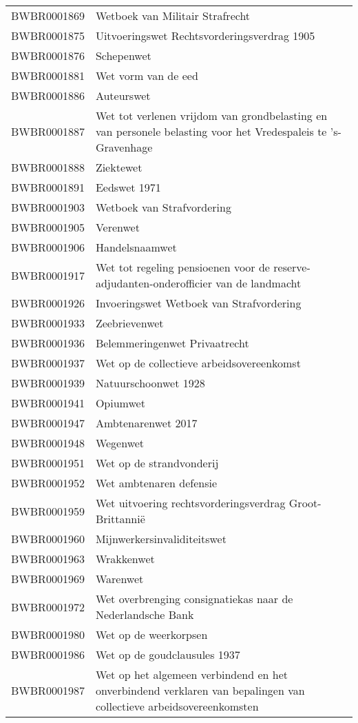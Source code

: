 \begin{longtable}{lp{}}
BWBR0001869 & Wetboek van Militair Strafrecht \\
BWBR0001875 & Uitvoeringswet Rechtsvorderingsverdrag 1905 \\
BWBR0001876 & Schepenwet \\
BWBR0001881 & Wet vorm van de eed \\
BWBR0001886 & Auteurswet \\
BWBR0001887 & Wet tot verlenen vrijdom van grondbelasting en van personele belasting voor het Vredespaleis te 's-Gravenhage \\
BWBR0001888 & Ziektewet \\
BWBR0001891 & Eedswet 1971 \\
BWBR0001903 & Wetboek van Strafvordering \\
BWBR0001905 & Verenwet \\
BWBR0001906 & Handelsnaamwet \\
BWBR0001917 & Wet tot regeling pensioenen voor de reserve-adjudanten-onderofficier van de landmacht \\
BWBR0001926 & Invoeringswet Wetboek van Strafvordering \\
BWBR0001933 & Zeebrievenwet \\
BWBR0001936 & Belemmeringenwet Privaatrecht \\
BWBR0001937 & Wet op de collectieve arbeidsovereenkomst  \\
BWBR0001939 & Natuurschoonwet 1928 \\
BWBR0001941 & Opiumwet \\
BWBR0001947 & Ambtenarenwet 2017 \\
BWBR0001948 & Wegenwet \\
BWBR0001951 & Wet op de strandvonderij \\
BWBR0001952 & Wet ambtenaren defensie \\
BWBR0001959 & Wet uitvoering rechtsvorderingsverdrag Groot-Brittannië \\
BWBR0001960 & Mijnwerkersinvaliditeitswet \\
BWBR0001963 & Wrakkenwet \\
BWBR0001969 & Warenwet \\
BWBR0001972 & Wet overbrenging consignatiekas naar de Nederlandsche Bank \\
BWBR0001980 & Wet op de weerkorpsen \\
BWBR0001986 & Wet op de goudclausules 1937 \\
BWBR0001987 & Wet op het algemeen verbindend en het onverbindend verklaren van bepalingen van collectieve arbeidsovereenkomsten \\

\end{longtable}
